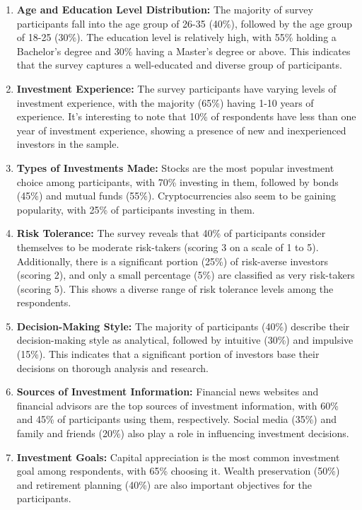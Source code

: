 \begin{enumerate}
  \item \textbf{Age and Education Level Distribution:} The majority of survey participants fall into the age group of 26-35 (40\%), followed by the age group of 18-25 (30\%). The education level is relatively high, with 55\% holding a Bachelor's degree and 30\% having a Master's degree or above. This indicates that the survey captures a well-educated and diverse group of participants.
  
  \item \textbf{Investment Experience:} The survey participants have varying levels of investment experience, with the majority (65\%) having 1-10 years of experience. It's interesting to note that 10\% of respondents have less than one year of investment experience, showing a presence of new and inexperienced investors in the sample.
  
  \item \textbf{Types of Investments Made:} Stocks are the most popular investment choice among participants, with 70\% investing in them, followed by bonds (45\%) and mutual funds (55\%). Cryptocurrencies also seem to be gaining popularity, with 25\% of participants investing in them.
  
  \item \textbf{Risk Tolerance:} The survey reveals that 40\% of participants consider themselves to be moderate risk-takers (scoring 3 on a scale of 1 to 5). Additionally, there is a significant portion (25\%) of risk-averse investors (scoring 2), and only a small percentage (5\%) are classified as very risk-takers (scoring 5). This shows a diverse range of risk tolerance levels among the respondents.
  
  \item \textbf{Decision-Making Style:} The majority of participants (40\%) describe their decision-making style as analytical, followed by intuitive (30\%) and impulsive (15\%). This indicates that a significant portion of investors base their decisions on thorough analysis and research.
  
  \item \textbf{Sources of Investment Information:} Financial news websites and financial advisors are the top sources of investment information, with 60\% and 45\% of participants using them, respectively. Social media (35\%) and family and friends (20\%) also play a role in influencing investment decisions.
  
  \item \textbf{Investment Goals:} Capital appreciation is the most common investment goal among respondents, with 65\% choosing it. Wealth preservation (50\%) and retirement planning (40\%) are also important objectives for the participants.
  

\end{enumerate}
